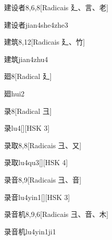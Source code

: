 \begin{entry}{建设者}{8,6,8}[Radicais ⼵、⾔、⽼]
  \begin{phonetics}{建设者}{jian4she4zhe3}
  \end{phonetics}
\end{entry}

\begin{entry}{建筑}{8,12}[Radicais ⼵、⽵]
  \begin{phonetics}{建筑}{jian4zhu4}
  \end{phonetics}
\end{entry}

\begin{entry}{廻}{8}[Radical ⼵]
  \begin{phonetics}{廻}{hui2}
  \end{phonetics}
\end{entry}

\begin{entry}{录}{8}[Radical ⼹]
  \begin{phonetics}{录}{lu4}[][HSK 3]
  \end{phonetics}
\end{entry}

\begin{entry}{录取}{8,8}[Radicais ⼹、⼜]
  \begin{phonetics}{录取}{lu4qu3}[][HSK 4]
  \end{phonetics}
\end{entry}

\begin{entry}{录音}{8,9}[Radicais ⼹、⾳]
  \begin{phonetics}{录音}{lu4yin1}[][HSK 3]
  \end{phonetics}
\end{entry}

\begin{entry}{录音机}{8,9,6}[Radicais ⼹、⾳、⽊]
  \begin{phonetics}{录音机}{lu4yin1ji1}
  \end{phonetics}
\end{entry}

